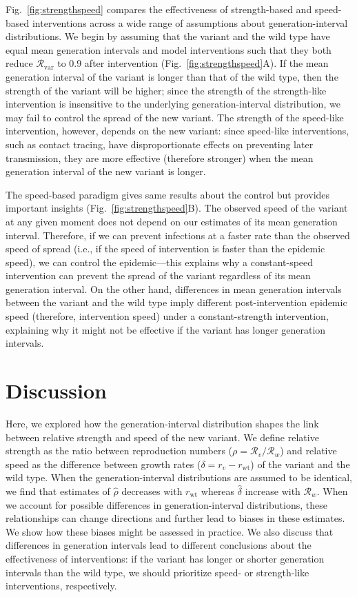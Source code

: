 \documentclass[12pt]{article}
\newcommand{\fref}[1]{Fig.~\ref{fig:#1}}
\newcommand{\rx}[1]{\ensuremath{{r}_{#1}}\xspace}
\newcommand{\ry}[1]{\rx{\mathrm{#1}}}
\newcommand{\rw}{\ry{wt}}
\newcommand{\Rx}[1]{\ensuremath{{\mathcal R}_{#1}}\xspace}
\newcommand{\Ry}[1]{\Rx{\mathrm{#1}}}
\newcommand{\RR}{\ensuremath{{\mathcal R}}\xspace}
\begin{document}
\fref{strengthspeed} compares the effectiveness of strength-based and speed-based interventions across a wide range of assumptions about generation-interval distributions.
We begin by assuming that the variant and the wild type have equal mean generation intervals and model interventions such that they both reduce $\Ry{var}$ to 0.9 after intervention (\fref{strengthspeed}A).
If the mean generation interval of the variant is longer than that of the wild type, then the strength of the variant will be higher;
since the strength of the strength-like intervention is insensitive to the underlying generation-interval distribution, we may fail to control the spread of the new variant.
The strength of the speed-like intervention, however, depends on the new variant:
since speed-like interventions, such as contact tracing, have disproportionate effects on preventing later transmission, they are more effective (therefore stronger) when the mean generation interval of the new variant is longer.

The speed-based paradigm gives same results about the control but provides important insights (\fref{strengthspeed}B).
The observed speed of the variant at any given moment does not depend on our estimates of its mean generation interval.
Therefore, if we can prevent infections at a faster rate than the observed speed of spread (i.e., if the speed of intervention is faster than the epidemic speed), we can control the epidemic---this explains why a constant-speed intervention can prevent the spread of the variant regardless of its mean generation interval.
On the other hand, differences in mean generation intervals between the variant and the wild type imply different post-intervention epidemic speed (therefore, intervention speed) under a constant-strength intervention, explaining why it might not be effective if the variant has longer generation intervals.

\section{Discussion}

Here, we explored how the generation-interval distribution shapes the link between relative strength and speed of the new variant.
We define relative strength as the ratio between reproduction numbers ($\rho=\RR_v/\RR_w$) and relative speed as the difference between growth rates ($\delta=r_v-\rw$) of the variant and the wild type.
When the generation-interval distributions are assumed to be identical, we find that estimates of $\hat{\rho}$ decreases with $\rw$ whereas $\hat{\delta}$ increase with $\RR_w$.
When we account for possible differences in generation-interval distributions, these relationships can change directions and further lead to biases in these estimates.
We show how these biases might be assessed in practice.
We also discuss that differences in generation intervals lead to different conclusions about the effectiveness of interventions:
if the variant has longer or shorter generation intervals than the wild type, we should prioritize speed- or strength-like interventions, respectively.
\end{document}
